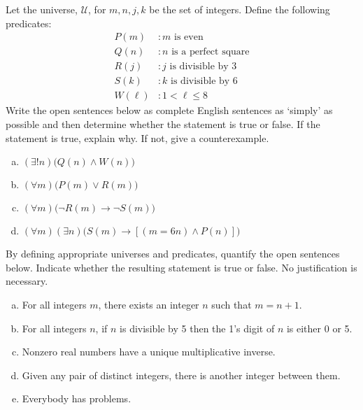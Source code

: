 \documentclass[11pt,letterpaper]{article}
\begin{document}

 Let the universe, $\mathcal{U}$, for $m, n, j, k$ be the set of integers. Define the following predicates:
	\[
	\begin{aligned}
	P(m) &\colon m \text{ is even} \\
	Q(n) &\colon n \text{ is a perfect square} \\
	R(j) &\colon j \text{ is divisible by 3} \\
	S(k) &\colon k \text{ is divisible by 6} \\
	W(\ell) &\colon 1 < \ell \leq 8
	\end{aligned}
	\]
Write the open sentences below as complete English sentences as `simply' as possible and then determine whether the statement is true or false. If the statement is true, explain why. If not, give a counterexample. 
	\begin{enumerate}[(a)]
	\item $(\exists! n) \big( Q(n) \wedge W(n) \big)$ 
	\item $(\forall m) \big( P(m) \vee R(m) \big)$ 
	\item $(\forall m) \big( \neg R(m) \to \neg S(m) \big)$ 
	\item $(\forall m) (\exists n) \big( S(m) \to [(m= 6n) \wedge P(n)] \big)$ 
	\end{enumerate} 



\newpage



 By defining appropriate universes and predicates, quantify the open sentences below. Indicate whether the resulting statement is true or false. No justification is necessary. 
	\begin{enumerate}[(a)]
	\item For all integers $m$, there exists an integer $n$ such that $m= n + 1$.
	\item For all integers $n$, if $n$ is divisible by 5 then the 1's digit of $n$ is either 0 or 5.
	\item Nonzero real numbers have a unique multiplicative inverse. 
	\item Given any pair of distinct integers, there is another integer between them.
	\item Everybody has problems. 
	\end{enumerate}
\end{document}
